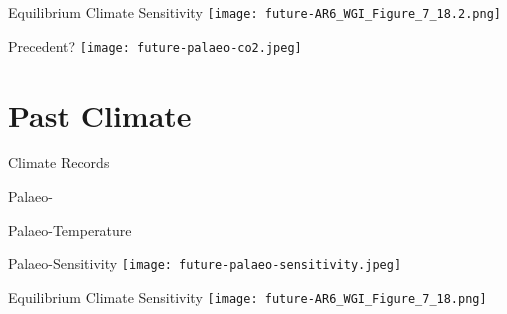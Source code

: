\begin{frame}{Equilibrium Climate Sensitivity}
    \centering
    \texttt{[image: future-AR6\_WGI\_Figure\_7\_18.2.png]}
\end{frame}

\begin{frame}{Precedent?}
    \centering
    \texttt{[image: future-palaeo-co2.jpeg]}
\end{frame}            

\section{Past Climate}

\begin{frame}{Climate Records}
\end{frame}

\begin{frame}{Palaeo-}
\end{frame}

\begin{frame}{Palaeo-Temperature}
\end{frame}

\begin{frame}{Palaeo-Sensitivity}
    \texttt{[image: future-palaeo-sensitivity.jpeg]}
\end{frame}

\begin{frame}{Equilibrium Climate Sensitivity}
    \centering
    \texttt{[image: future-AR6\_WGI\_Figure\_7\_18.png]}

\end{frame}

